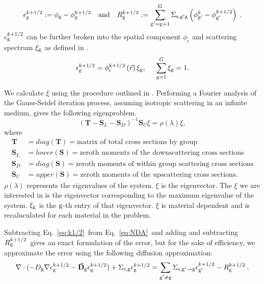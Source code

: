   \begin{equation}
  \epsilon_{\mathrm{g}}^{k+1/2} := \phi_{\mathrm{g}} - \phi_{\mathrm{g}}^{k + 1/2} \quad \mathrm{and} \quad R_{\mathrm{g}}^{k+1/2} := \sum\limits_{\mathrm{g}'=\mathrm{g}+1}^{\mathrm{G}} \Sigma_{\mathrm{s},\mathrm{g}' \mathrm{g}}\left(\phi_{\mathrm{g}'}^k - \phi_{\mathrm{g}'}^{k + 1/2}\right)\:.
  \end{equation}
  $\epsilon_{\mathrm{g}}^{k + 1/2}$ can be further broken into the spatial component $\phi_{\epsilon}$ and scattering spectrum $\xi_{\mathrm{g}}$ as defined in \cite{morel-upscat, evans-upscat}.
  \begin{equation}
  \epsilon_{\mathrm{g}}^{k+1/2} = \phi_{\epsilon}^{k+1/2}\left(\vec{r}\right)\xi_{\mathrm{g}}, \hspace{5mm} \sum\limits_{\mathrm{g}=1}^G \xi_{\mathrm{g}} = 1.
  \label{eq:decomp}
  \end{equation}
  
  We calculate $\xi$ using the procedure outlined in \cite{evans-upscat}. Performing a Fourier analysis of the Gauss-Seidel iteration process, assuming isotropic scattering in an infinite medium, gives the following eigenproblem. 
  \begin{equation}
      (\textbf{T} - \textbf{S}_L - \textbf{S}_D)^{-1}\textbf{S}_U \xi = \rho(\lambda)\xi,
    \label{eq:eigenvector}
  \end{equation}
  where
  \begin{align*}
      \textbf{T} &= diag(\textbf{T}) =  \text{matrix of total cross sections by group} \\
      \textbf{S}_L &= lower(\textbf{S}) = \text{zeroth moments of the downscattering cross sections} \\
      \textbf{S}_D &= diag(\textbf{S}) = \text{zeroth moments of within group scattering cross sections} \\
      \textbf{S}_U &= upper(\textbf{S}) = \text{zeroth moments of the upscattering cross sections.}
  \end{align*}
  $\rho(\lambda)$ represents the eigenvalues of the system. $\xi$ is the eigenvector. The $\xi$ we are interested in is the eigenvector corresponding to the maximum eigenvalue of the system. $\xi_{\mathrm{g}}$ is the $\mathrm{g}$-th entry of that eigenvector. $\xi$ is material dependent and is recaluculated for each material in the problem.
  \par
  Subtracting Eq.\ \eqref{eq:k1/2}\ from Eq.\ \eqref{eq:NDA}\ and adding and subtracting $R_{\mathrm{g}}^{k+1/2}$\ gives an exact formulation of the error, but for the sake of efficiency, we approximate the error using the following diffusion approximation:
  \begin{equation}
  \nabla\cdot(-D_{\mathrm{g}}  \nabla \epsilon_{\mathrm{g}}^{k+1/2} - \vec{\bf D}_{\mathrm{g}}
  \epsilon_{\mathrm{g}}^{k+1/2}) + \Sigma_{r,\mathrm{g}}  \epsilon_{\mathrm{g}}^{k+1/2} =  \sum\limits_{\substack{{\mathrm{g}'}\neq\mathrm{g}}} \Sigma_{\mathrm{s},\mathrm{g}' \to\mathrm{g}}  \epsilon_{\mathrm{g}'}^{k+1/2} -  R^{k+1/2}_{\mathrm{g}} \:.
  \end{equation}
